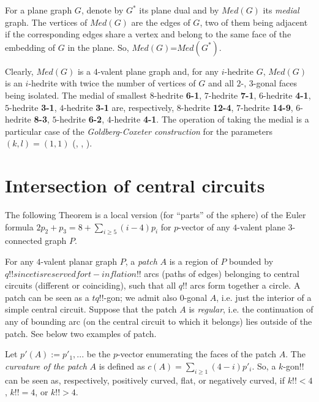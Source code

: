 \documentclass[12pt]{article}
\begin{document}
For a plane graph $G$, denote by $G^*$ its plane dual and by {\em $Med(G)$} 
its {\em medial} graph. The vertices of $Med(G)$ are the edges of 
$G$, two of them being adjacent if the corresponding edges share a vertex and 
belong to the same face of the embedding of $G$ in the plane. 
So, $Med(G)$=$Med(G^*)$.

Clearly, $Med(G)$ is a $4$-valent plane graph and, for any $i$-hedrite $G$,
$Med(G)$ is an $i$-hedrite with twice the number of vertices of $G$ and
all $2$-, $3$-gonal faces being isolated. The medial of smallest
$8$-hedrite {\bf 6-1}, $7$-hedrite {\bf 7-1}, $6$-hedrite {\bf 4-1},
$5$-hedrite {\bf 3-1}, $4$-hedrite {\bf 3-1} are, respectively, $8$-hedrite
{\bf 12-4}, $7$-hedrite {\bf 14-9}, $6$-hedrite {\bf 8-3},
$5$-hedrite {\bf 6-2}, $4$-hedrite {\bf 4-1}.
The operation of taking the medial is a particular case of the {\em Goldberg-Coxeter construction} for the parameters $(k,l)=(1,1)$ (\cite{Gold37}, \cite{Cox71}, \cite{DD03}).





\section{Intersection of central circuits}

The following Theorem is a local version (for ``parts'' of the sphere) of
the Euler formula
$2p_2+p_3=8+ \sum_{i\geq 5} (i-4)p_i$ for $p$-vector of any $4$-valent 
plane $3$-connected graph $P$.

For any $4$-valent planar graph $P$, a {\em patch} $A$ is a region of $P$
bounded by $q!!since t is reserved for t-inflation!!$ arcs (paths of edges) 
belonging to central circuits 
(different or coinciding), such that all 
$q!!$ arcs form together a circle. 
A patch can be seen as a $tq!!$-gon; we admit also 
$0$-gonal $A$, i.e. just the interior of a simple central circuit. 
Suppose that the patch $A$ is {\em regular}, i.e.
the continuation of any of bounding arc (on the central circuit to which it
belongs) lies outside of the patch.
See below two examples of patch.

\begin{center}
\epsfxsize=60mm
\end{center}

Let $p'(A):=p'_1,...$ be the $p$-vector enumerating the faces of the 
patch $A$. The {\em curvature of the patch} $A$ is defined as
$c(A)=\sum_{i\geq 1} (4-i)p'_i$. So, a $k$-gon!! can be seen as,
respectively, positively curved, flat, or negatively curved, if
$k!!<4$, $k!!=4$, or $k!!>4$.
\end{document}
